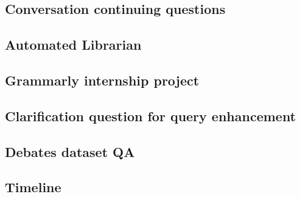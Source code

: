 \documentclass[11pt]{article}
\begin{document}
\subsection{Conversation continuing questions}

\subsection{Automated Librarian}

\subsection{Grammarly internship project}

\subsection{Clarification question for query enhancement}

\subsection{Debates dataset QA}

\fi

\subsection{Timeline}

\section{}
\end{document}

